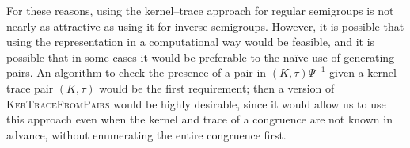 For these reasons, using the kernel--trace approach for regular semigroups is not
nearly as attractive as using it for inverse semigroups.  However, it is
possible that using the representation in a computational way would be feasible,
and it is possible that in some cases it would be preferable to the na\"{i}ve
use of generating pairs.  An algorithm to check the presence of a pair in
$(K,\tau)\Psi^{-1}$ given a kernel--trace pair $(K,\tau)$ would be the first
requirement; then a version of \textsc{KerTraceFromPairs} would be highly
desirable, since it would allow us to use this approach even when the kernel and
trace of a congruence are not known in advance, without enumerating the entire
congruence first.
